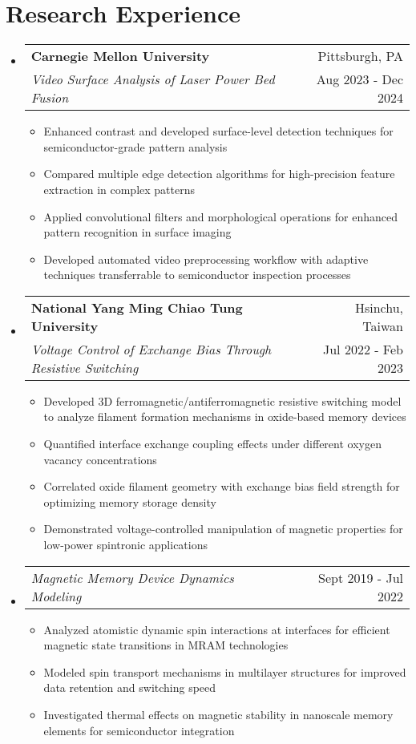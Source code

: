 \documentclass[a4paper,11pt]{article}
\makeatletter
\newcommand{\resumeItem}[1]{
  \item\small{
    {#1 \vspace{-1pt}}
  }
}
\newcommand{\resumeDoubleHeading}[4]{
  \vspace{-2pt}\item
    \begin{tabular*}{0.97\textwidth}[t]{l@{\extracolsep{\fill}}r}
        \textbf{#1} & #2 \\
        \textit{\small#3} & {\small #4} \\
    \end{tabular*}\vspace{-5pt}
}
\newcommand{\resumeSubheading}[2]{
  \vspace{-2pt}\item
    \begin{tabular*}{0.97\textwidth}[t]{l@{\extracolsep{\fill}}r}
      \textit{\small#1} & {\small #2} \\
    \end{tabular*}\vspace{-5pt}
}
\newcommand{\resumeSubHeadingListStart}{\begin{itemize}[leftmargin=0.15in, label={}]}
\newcommand{\resumeSubHeadingListEnd}{\end{itemize}}
\newcommand{\resumeItemListStart}{\begin{itemize}}
\newcommand{\resumeItemListEnd}{\end{itemize}\vspace{-5pt}}
\makeatother
\begin{document}

\section{Research Experience}
  \resumeSubHeadingListStart
  \resumeDoubleHeading
    {Carnegie Mellon University}{Pittsburgh, PA}
    {Video Surface Analysis of Laser Power Bed Fusion}{Aug 2023 - Dec 2024}
        \resumeItemListStart
            \resumeItem{Enhanced contrast and developed surface-level detection techniques for semiconductor-grade pattern analysis}
            \resumeItem{Compared multiple edge detection algorithms for high-precision feature extraction in complex patterns}
            \resumeItem{Applied convolutional filters and morphological operations for enhanced pattern recognition in surface imaging}
            \resumeItem{Developed automated video preprocessing workflow with adaptive techniques transferrable to semiconductor inspection processes}
        \resumeItemListEnd
    \resumeDoubleHeading
    {National Yang Ming Chiao Tung University}{Hsinchu, Taiwan}
    {Voltage Control of Exchange Bias Through Resistive Switching}{Jul 2022 - Feb 2023}
    \resumeItemListStart
        \resumeItem{Developed 3D ferromagnetic/antiferromagnetic resistive switching model to analyze filament formation mechanisms in oxide-based memory devices}
        \resumeItem{Quantified interface exchange coupling effects under different oxygen vacancy concentrations}
        \resumeItem{Correlated oxide filament geometry with exchange bias field strength for optimizing memory storage density}
        \resumeItem{Demonstrated voltage-controlled manipulation of magnetic properties for low-power spintronic applications}
    \resumeItemListEnd

    \resumeSubheading{Magnetic Memory Device Dynamics Modeling}{Sept 2019 - Jul 2022}
        \resumeItemListStart
            \resumeItem{Analyzed atomistic dynamic spin interactions at interfaces for efficient magnetic state transitions in MRAM technologies}
            \resumeItem{Modeled spin transport mechanisms in multilayer structures for improved data retention and switching speed}
            \resumeItem{Investigated thermal effects on magnetic stability in nanoscale memory elements for semiconductor integration}
        \resumeItemListEnd

  \resumeSubHeadingListEnd
\end{document}
